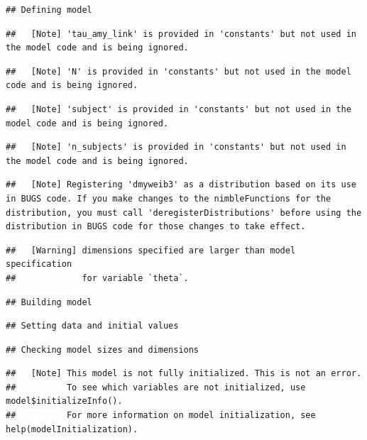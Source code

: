 \documentclass[
]{article}
\begin{document}
\begin{verbatim}
## Defining model
\end{verbatim}

\begin{verbatim}
##   [Note] 'tau_amy_link' is provided in 'constants' but not used in the model code and is being ignored.
\end{verbatim}

\begin{verbatim}
##   [Note] 'N' is provided in 'constants' but not used in the model code and is being ignored.
\end{verbatim}

\begin{verbatim}
##   [Note] 'subject' is provided in 'constants' but not used in the model code and is being ignored.
\end{verbatim}

\begin{verbatim}
##   [Note] 'n_subjects' is provided in 'constants' but not used in the model code and is being ignored.
\end{verbatim}

\begin{verbatim}
##   [Note] Registering 'dmyweib3' as a distribution based on its use in BUGS code. If you make changes to the nimbleFunctions for the distribution, you must call 'deregisterDistributions' before using the distribution in BUGS code for those changes to take effect.
\end{verbatim}

\begin{verbatim}
##   [Warning] dimensions specified are larger than model specification
##             for variable `theta`.
\end{verbatim}

\begin{verbatim}
## Building model
\end{verbatim}

\begin{verbatim}
## Setting data and initial values
\end{verbatim}

\begin{verbatim}
## Checking model sizes and dimensions
\end{verbatim}

\begin{verbatim}
##   [Note] This model is not fully initialized. This is not an error.
##          To see which variables are not initialized, use model$initializeInfo().
##          For more information on model initialization, see help(modelInitialization).
\end{verbatim}
\end{document}
